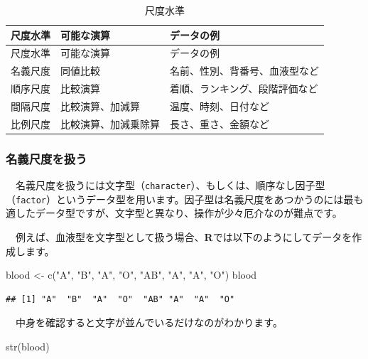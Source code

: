 \documentclass[
  12pt,
]{book}
\newenvironment{Shaded}{\begin{snugshade}}{\end{snugshade}}
\newcommand{\FunctionTok}[1]{\textcolor[rgb]{0.00,0.00,0.00}{#1}}
\newcommand{\NormalTok}[1]{#1}
\newcommand{\OtherTok}[1]{\textcolor[rgb]{0.56,0.35,0.01}{#1}}
\newcommand{\StringTok}[1]{\textcolor[rgb]{0.31,0.60,0.02}{#1}}
\begin{document}
\begin{longtable}[]{@{}lll@{}}
\caption{尺度水準}\tabularnewline
\toprule
尺度水準 & 可能な演算 & データの例 \\
\midrule
\endfirsthead
\toprule
尺度水準 & 可能な演算 & データの例 \\
\midrule
\endhead
名義尺度 & 同値比較 & 名前、性別、背番号、血液型など \\
順序尺度 & 比較演算 & 着順、ランキング、段階評価など \\
間隔尺度 & 比較演算、加減算 & 温度、時刻、日付など \\
比例尺度 & 比較演算、加減乗除算 & 長さ、重さ、金額など \\
\bottomrule
\end{longtable}

\hypertarget{ux540dux7fa9ux5c3aux5ea6ux3092ux6271ux3046}{%
\subsubsection*{名義尺度を扱う}\label{ux540dux7fa9ux5c3aux5ea6ux3092ux6271ux3046}}

　名義尺度を扱うには文字型（\texttt{character}）、もしくは、順序なし因子型（\texttt{factor}）というデータ型を用います。因子型は名義尺度をあつかうのには最も適したデータ型ですが、文字型と異なり、操作が少々厄介なのが難点です。

　例えば、血液型を文字型として扱う場合、\textbf{R}では以下のようにしてデータを作成します。

\begin{Shaded}
\begin{Highlighting}[numbers=left,,]
\NormalTok{blood }\OtherTok{\textless{}{-}} \FunctionTok{c}\NormalTok{(}\StringTok{"A"}\NormalTok{, }\StringTok{"B"}\NormalTok{, }\StringTok{"A"}\NormalTok{, }\StringTok{"O"}\NormalTok{, }\StringTok{"AB"}\NormalTok{, }\StringTok{"A"}\NormalTok{, }\StringTok{"A"}\NormalTok{, }\StringTok{"O"}\NormalTok{)}
\NormalTok{blood}
\end{Highlighting}
\end{Shaded}

\begin{verbatim}
## [1] "A"  "B"  "A"  "O"  "AB" "A"  "A"  "O"
\end{verbatim}

　中身を確認すると文字が並んでいるだけなのがわかります。

\begin{Shaded}
\begin{Highlighting}[numbers=left,,]
\FunctionTok{str}\NormalTok{(blood)}
\end{Highlighting}
\end{Shaded}
\end{document}
